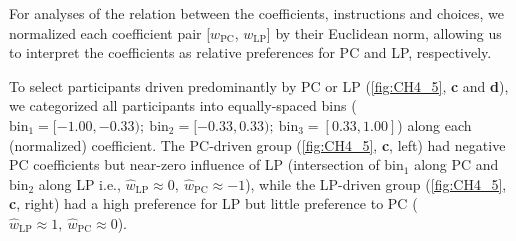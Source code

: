 For analyses of the relation between the coefficients, instructions and choices, we normalized each coefficient pair [$w_{\mathrm{PC}}$, $w_{\mathrm{LP}}$] by their Euclidean norm, allowing us to interpret the coefficients as relative preferences for \ac{PC} and \ac{LP}, respectively. 

To select participants driven predominantly by \ac{PC} or \ac{LP} (\cref{fig:CH4_5}, \textbf{c} and \textbf{d}), we categorized all participants into equally-spaced bins ($\text{bin}_1 = [-1.00, -0.33);\ \text{bin}_2 = [-0.33, 0.33);\ \text{bin}_3 = [0.33, 1.00]$) along each (normalized) coefficient. The \ac{PC}-driven group (\cref{fig:CH4_5}, \textbf{c}, left) had negative PC coefficients but near-zero influence of LP (intersection of $\text{bin}_1$ along \ac{PC} and $\text{bin}_2$ along \ac{LP} i.e., $\hat w_\text{LP} \approx 0,\ \hat w_\text{PC} \approx -1$), while the \ac{LP}-driven group (\cref{fig:CH4_5}, \textbf{c}, right) had a high preference for \ac{LP} but little preference to \ac{PC} ($\hat w_\text{LP} \approx 1,\ \hat w_\text{PC} \approx 0$). 